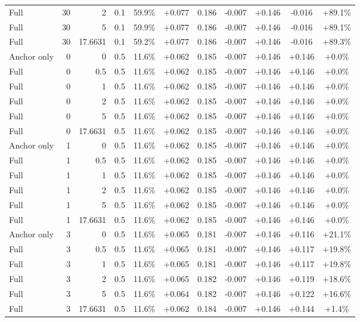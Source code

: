 \begin{table}[htbp]
\begin{tabular}{lrrrccccccc}
Full & 30 & 2 & 0.1 & 59.9\% & +0.077 & 0.186 & -0.007 & +0.146 & -0.016 & +89.1\% \\
Full & 30 & 5 & 0.1 & 59.9\% & +0.077 & 0.186 & -0.007 & +0.146 & -0.016 & +89.1\% \\
Full & 30 & 17.6631 & 0.1 & 59.2\% & +0.077 & 0.186 & -0.007 & +0.146 & -0.016 & +89.3\% \\
Anchor only & 0 & 0 & 0.5 & 11.6\% & +0.062 & 0.185 & -0.007 & +0.146 & +0.146 & +0.0\% \\
Full & 0 & 0.5 & 0.5 & 11.6\% & +0.062 & 0.185 & -0.007 & +0.146 & +0.146 & +0.0\% \\
Full & 0 & 1 & 0.5 & 11.6\% & +0.062 & 0.185 & -0.007 & +0.146 & +0.146 & +0.0\% \\
Full & 0 & 2 & 0.5 & 11.6\% & +0.062 & 0.185 & -0.007 & +0.146 & +0.146 & +0.0\% \\
Full & 0 & 5 & 0.5 & 11.6\% & +0.062 & 0.185 & -0.007 & +0.146 & +0.146 & +0.0\% \\
Full & 0 & 17.6631 & 0.5 & 11.6\% & +0.062 & 0.185 & -0.007 & +0.146 & +0.146 & +0.0\% \\
Anchor only & 1 & 0 & 0.5 & 11.6\% & +0.062 & 0.185 & -0.007 & +0.146 & +0.146 & +0.0\% \\
Full & 1 & 0.5 & 0.5 & 11.6\% & +0.062 & 0.185 & -0.007 & +0.146 & +0.146 & +0.0\% \\
Full & 1 & 1 & 0.5 & 11.6\% & +0.062 & 0.185 & -0.007 & +0.146 & +0.146 & +0.0\% \\
Full & 1 & 2 & 0.5 & 11.6\% & +0.062 & 0.185 & -0.007 & +0.146 & +0.146 & +0.0\% \\
Full & 1 & 5 & 0.5 & 11.6\% & +0.062 & 0.185 & -0.007 & +0.146 & +0.146 & +0.0\% \\
Full & 1 & 17.6631 & 0.5 & 11.6\% & +0.062 & 0.185 & -0.007 & +0.146 & +0.146 & +0.0\% \\
Anchor only & 3 & 0 & 0.5 & 11.6\% & +0.065 & 0.181 & -0.007 & +0.146 & +0.116 & +21.1\% \\
Full & 3 & 0.5 & 0.5 & 11.6\% & +0.065 & 0.181 & -0.007 & +0.146 & +0.117 & +19.8\% \\
Full & 3 & 1 & 0.5 & 11.6\% & +0.065 & 0.181 & -0.007 & +0.146 & +0.117 & +19.8\% \\
Full & 3 & 2 & 0.5 & 11.6\% & +0.065 & 0.182 & -0.007 & +0.146 & +0.119 & +18.6\% \\
Full & 3 & 5 & 0.5 & 11.6\% & +0.064 & 0.182 & -0.007 & +0.146 & +0.122 & +16.6\% \\
Full & 3 & 17.6631 & 0.5 & 11.6\% & +0.062 & 0.184 & -0.007 & +0.146 & +0.144 & +1.4\% \\

\end{tabular}
\end{table}
